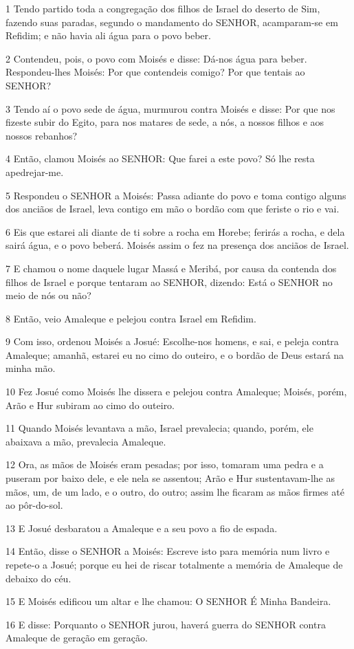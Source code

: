 \par 1 Tendo partido toda a congregação dos filhos de Israel do deserto de Sim, fazendo suas paradas, segundo o mandamento do SENHOR, acamparam-se em Refidim; e não havia ali água para o povo beber.
\par 2 Contendeu, pois, o povo com Moisés e disse: Dá-nos água para beber. Respondeu-lhes Moisés: Por que contendeis comigo? Por que tentais ao SENHOR?
\par 3 Tendo aí o povo sede de água, murmurou contra Moisés e disse: Por que nos fizeste subir do Egito, para nos matares de sede, a nós, a nossos filhos e aos nossos rebanhos?
\par 4 Então, clamou Moisés ao SENHOR: Que farei a este povo? Só lhe resta apedrejar-me.
\par 5 Respondeu o SENHOR a Moisés: Passa adiante do povo e toma contigo alguns dos anciãos de Israel, leva contigo em mão o bordão com que feriste o rio e vai.
\par 6 Eis que estarei ali diante de ti sobre a rocha em Horebe; ferirás a rocha, e dela sairá água, e o povo beberá. Moisés assim o fez na presença dos anciãos de Israel.
\par 7 E chamou o nome daquele lugar Massá e Meribá, por causa da contenda dos filhos de Israel e porque tentaram ao SENHOR, dizendo: Está o SENHOR no meio de nós ou não?
\par 8 Então, veio Amaleque e pelejou contra Israel em Refidim.
\par 9 Com isso, ordenou Moisés a Josué: Escolhe-nos homens, e sai, e peleja contra Amaleque; amanhã, estarei eu no cimo do outeiro, e o bordão de Deus estará na minha mão.
\par 10 Fez Josué como Moisés lhe dissera e pelejou contra Amaleque; Moisés, porém, Arão e Hur subiram ao cimo do outeiro.
\par 11 Quando Moisés levantava a mão, Israel prevalecia; quando, porém, ele abaixava a mão, prevalecia Amaleque.
\par 12 Ora, as mãos de Moisés eram pesadas; por isso, tomaram uma pedra e a puseram por baixo dele, e ele nela se assentou; Arão e Hur sustentavam-lhe as mãos, um, de um lado, e o outro, do outro; assim lhe ficaram as mãos firmes até ao pôr-do-sol.
\par 13 E Josué desbaratou a Amaleque e a seu povo a fio de espada.
\par 14 Então, disse o SENHOR a Moisés: Escreve isto para memória num livro e repete-o a Josué; porque eu hei de riscar totalmente a memória de Amaleque de debaixo do céu.
\par 15 E Moisés edificou um altar e lhe chamou: O SENHOR É Minha Bandeira.
\par 16 E disse: Porquanto o SENHOR jurou, haverá guerra do SENHOR contra Amaleque de geração em geração.

